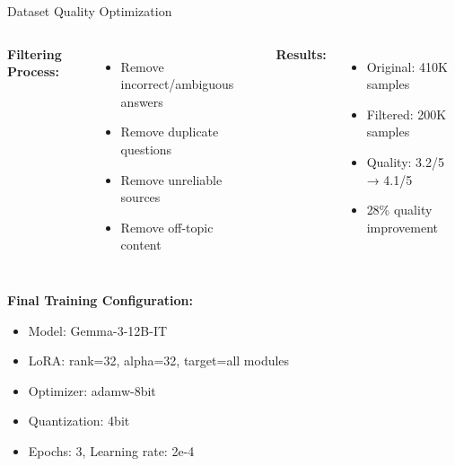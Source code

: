\begin{frame}{Dataset Quality Optimization}
    \begin{columns}[T]
        \textbf{Filtering Process:}
        \begin{itemize}
            \item Remove incorrect/ambiguous answers
            \item Remove duplicate questions
            \item Remove unreliable sources
            \item Remove off-topic content
        \end{itemize}
        
        \textbf{Results:}
        \begin{itemize}
            \item Original: 410K samples
            \item Filtered: 200K samples
            \item Quality: 3.2/5 → 4.1/5
            \item \textcolor{improvement}{28\% quality improvement}
        \end{itemize}
    \end{columns}
    
    \vspace{0.5em}
    
    \textbf{Final Training Configuration:}
    \begin{itemize}
        \item Model: Gemma-3-12B-IT
        \item LoRA: rank=32, alpha=32, target=all modules
        \item Optimizer: adamw-8bit
        \item Quantization: 4bit
        \item Epochs: 3, Learning rate: 2e-4
    \end{itemize}
\end{frame}

